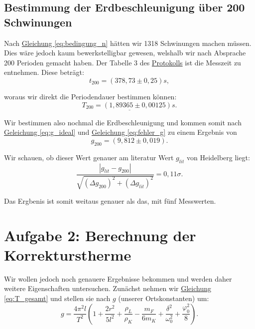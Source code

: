 \subsection*{Bestimmung der Erdbeschleunigung über 200 Schwinungen}

Nach \hyperref[eq:bedingung_n]{Gleichung \ref*{eq:bedingung_n}} hätten wir 1318 Schwinungen machen müssen. Dies wäre jedoch kaum bewerkstelligbar gewesen, welshalb wir nach Absprache 200 Perioden gemacht haben. Der Tabelle 3 des \hyperref[Protokoll]{Protokolls} ist die Messzeit zu entnehmen. Diese beträgt:
\begin{equation}
    t_{200} = (378,73 \pm 0,25)s,
\end{equation}

woraus wir direkt die Periodendauer bestimmen können:
\begin{equation}
    \underline{
        T_{200} = (1,89365 \pm 0,00125)s.
    }
\end{equation}

Wir bestimmen also nochmal die Erdbeschleunigung und kommen somit nach \hyperref[eq:g_ideal]{Geleichung \ref*{eq:g_ideal}} und \hyperref[eq:fehler_g]{Geleichung \ref*{eq:fehler_g}} zu einem Ergebnis von
\begin{equation}
    \boxed{
        g_{200} = (9,812 \pm 0,019)
    }.
\end{equation}

Wir schauen, ob dieser Wert genauer am literatur Wert $g_{lit}$ von Heidelberg liegt:
\begin{equation}
    \frac{\left| g_{lit} - g_{200} \right|}{\sqrt{(\Delta g_{200})^2 + (\Delta g_{lit})^2}} = 0,11\sigma.
\end{equation}

Das Ergbenis ist somit weitaus genauer als das, mit fünf Messwerten.

\section{Aufgabe 2: Berechnung der Korrekturstherme}
Wir wollen jedoch noch genauere Ergebnisse bekommen und werden daher weitere Eigenschaften untersuchen. Zunächst nehmen wir \hyperref[eq:T_gesamt]{Gleichung \ref*{eq:T_gesamt}} und stellen sie nach $g$ (unserer Ortskonstanten) um:
\begin{equation}
    g = \frac{4\pi^2 l}{T^2} \left(1 + \frac{2r^2}{5l^2} + \frac{\rho_L}{\rho_K} - \frac{m_F}{6 m_K} + \frac{\delta^2}{\omega_0^2} + \frac{\varphi_0^2}{8}\right).
    \label{eq:g_final}
\end{equation}

